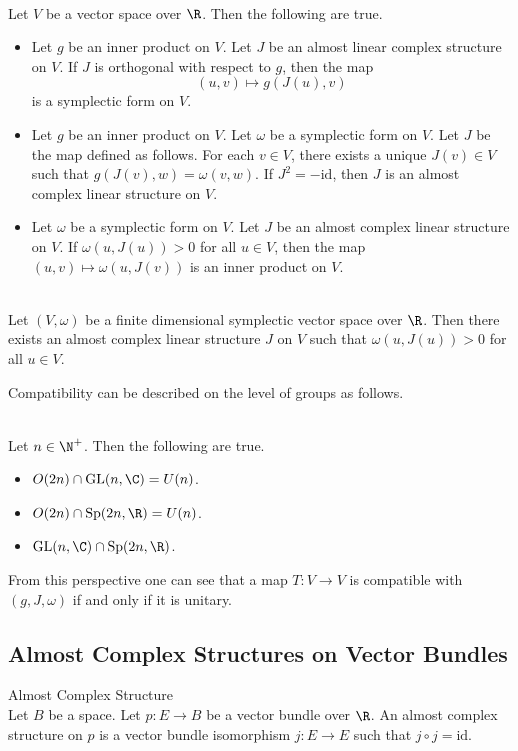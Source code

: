 \documentclass[a4paper]{article}
\begin{document}
\begin{prp}{}{}\\
Let $V$ be a vector space over $\R$. Then the following are true. 
\begin{itemize}
\item Let $g$ be an inner product on $V$. Let $J$ be an almost linear complex structure on $V$. If $J$ is orthogonal with respect to $g$, then the map $$(u,v)\mapsto g(J(u),v)$$ is a symplectic form on $V$. 
\item Let $g$ be an inner product on $V$. Let $\omega$ be a symplectic form on $V$. Let $J$ be the map defined as follows. For each $v\in V$, there exists a unique $J(v)\in V$ such that $g(J(v),w)=\omega(v,w)$. If $J^2=-\text{id}$, then $J$ is an almost complex linear structure on $V$. 
\item Let $\omega$ be a symplectic form on $V$. Let $J$ be an almost complex linear structure on $V$. If $\omega(u,J(u))>0$ for all $u\in V$, then the map $(u,v)\mapsto\omega(u,J(v))$ is an inner product on $V$. 
\end{itemize}
\end{prp}

\begin{prp}{}{}\\
Let $(V,\omega)$ be a finite dimensional symplectic vector space over $\R$. Then there exists an almost complex linear structure $J$ on $V$ such that $\omega(u,J(u))>0$ for all $u\in V$. 
\end{prp}

Compatibility can be described on the level of groups as follows. 

\begin{prp}{}{}\\
Let $n\in\N^+$. Then the following are true. 
\begin{itemize}
\item $O(2n)\cap\text{GL}(n,\C)=U(n)$. 
\item $O(2n)\cap\text{Sp}(2n,\R)=U(n)$. 
\item $\text{GL}(n,\C)\cap\text{Sp}(2n,\R)$. 
\end{itemize}
\end{prp}

From this perspective one can see that a map $T:V\to V$ is compatible with $(g,J,\omega)$ if and only if it is unitary. 

\subsection{Almost Complex Structures on Vector Bundles}
\begin{defn}{Almost Complex Structure}{}\\
Let $B$ be a space. Let $p:E\to B$ be a vector bundle over $\R$. An almost complex structure on $p$ is a vector bundle isomorphism $j:E\to E$ such that $j\circ j=\text{id}$. 
\end{defn}
\end{document}
